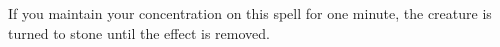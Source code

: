 If you maintain your concentration on this spell for one minute, the creature is turned to stone until the effect is removed.















